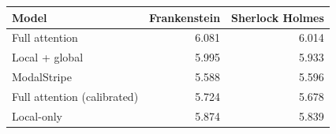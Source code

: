 \begin{tabular}{lrr}\toprule
Model & Frankenstein & Sherlock Holmes\\\midrule
Full attention & 6.081 & 6.014 \\
Local + global & 5.995 & 5.933 \\
ModalStripe & 5.588 & 5.596 \\
Full attention (calibrated) & 5.724 & 5.678 \\
Local-only & 5.874 & 5.839 \\
\bottomrule\end{tabular}
